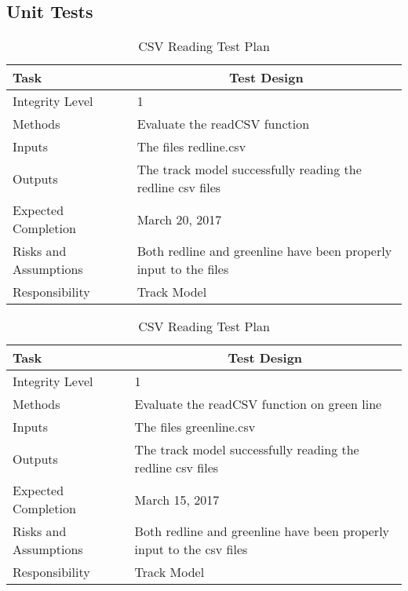 \documentclass[]{article}
\begin{document}
\subsection{Unit Tests}
\begin{table}[H]
	\centering
	\caption{CSV Reading Test Plan}
	\begin{tabular}{|l|l|}
		\hline
		Task & \multicolumn{1}{c|}{Test Design} \\ \hline
		Integrity Level & 1 \\ \hline
		Methods & Evaluate the readCSV function\\ \hline
		Inputs &  The files redline.csv \\ \hline
		Outputs &  The track model successfully reading the redline csv files\\ \hline
		Expected Completion & March 20, 2017\\ \hline
		Risks and Assumptions & Both redline and greenline have been properly input to the files\\ \hline
		Responsibility & Track Model\\ \hline
	\end{tabular}
\end{table}

\begin{table}[H]
	\centering
	\caption{CSV Reading Test Plan}
	\begin{tabular}{|l|l|}
		\hline
		Task & \multicolumn{1}{c|}{Test Design} \\ \hline
		Integrity Level & 1 \\ \hline
		Methods & Evaluate the readCSV function on green line\\ \hline
		Inputs &  The files greenline.csv \\ \hline
		Outputs &  The track model successfully reading the redline csv files\\ \hline
		Expected Completion & March 15, 2017\\ \hline
		Risks and Assumptions & \parbox[t]{10cm}{Both redline and greenline have been properly input to the csv files}\\ \hline
		Responsibility & Track Model\\ \hline
	\end{tabular}
\end{table}
\end{document}
